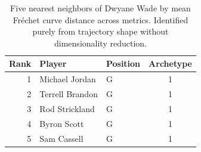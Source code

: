 \begin{table}[htbp]
  \centering\small
  \begin{tabular}{rllc}
    \toprule
    Rank & Player & Position & Archetype \\
    \midrule
    1 & Michael Jordan & G & 1 \\
    2 & Terrell Brandon & G & 1 \\
    3 & Rod Strickland & G & 1 \\
    4 & Byron Scott & G & 1 \\
    5 & Sam Cassell & G & 1 \\
    \bottomrule
  \end{tabular}
  \caption{Five nearest neighbors of Dwyane Wade by mean Fr\'{e}chet curve distance across metrics. Identified purely from trajectory shape without dimensionality reduction.}
  \label{tab:Dwyane_Wade_frechet_curve_neighbors}
\end{table}

